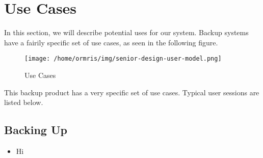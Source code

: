 \section{Use Cases}
In this section, we will describe potential uses for our system. Backup systems have a fairily specific set of use cases, as seen in the following figure.

\begin{figure}[h]
\centering\texttt{[image: /home/ormris/img/senior-design-user-model.png]}
\caption{Use Cases}
\end{figure}

This backup product has a very specific set of use cases. Typical user sessions are listed below.

\subsection{Backing Up}
\begin{itemize}
	\item Hi
\end{itemize}
